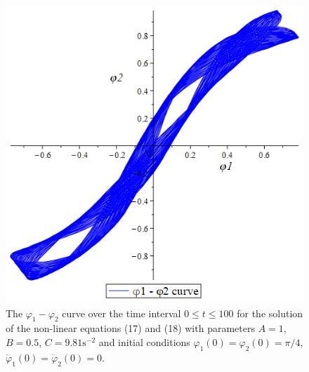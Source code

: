 \documentclass[11pt]{article}
\begin{document}
\begin{figure}[H]
    \centering
    \includegraphics[scale=0.4]{Figure6.PNG}
    \caption{The \(\varphi_1 - \varphi_2\) curve over the time interval \(0\le t\le 100\) for the solution of the non-linear equations (17) and (18) with parameters \(A = 1\), \(B= 0.5\), \(C = 9.81 \mathrm{s}^{-2}\) and initial conditions \(\varphi_1(0) = \varphi_2(0) = \pi/4\), \(\dot{\varphi}_1(0) = \dot{\varphi}_2(0) = 0\).}
    \label{Figure 6}
\end{figure}
\end{document}

